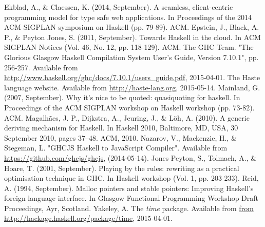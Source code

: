 \documentclass[preprint]{sigplanconf}
\begin{document}
\begin{thebibliography}{}
  Ekblad, A., \& Claessen, K. (2014, September).
  A seamless, client-centric programming model for type safe web applications.
  In Proceedings of the 2014 ACM SIGPLAN symposium on Haskell (pp. 79-89). ACM.
  Epstein, J., Black, A. P., \& Peyton Jones, S. (2011, September).
  Towards Haskell in the cloud.
  In ACM SIGPLAN Notices (Vol. 46, No. 12, pp. 118-129). ACM.
  The GHC Team.
  "The Glorious Glasgow Haskell Compilation System User’s Guide, Version 7.10.1",
  pp. 256-257.
  Available from \url{http://www.haskell.org/ghc/docs/7.10.1/users_guide.pdf},
  2015-04-01.
  The Haste language website.
  Available from \url{http://haste-lang.org}, 2015-05-14.
  Mainland, G. (2007, September).
  Why it's nice to be quoted: quasiquoting for haskell.
  In Proceedings of the ACM SIGPLAN workshop on Haskell workshop (pp. 73-82).
  ACM.
  Magalhães, J. P., Dijkstra, A., Jeuring, J., \& Löh, A. (2010).
  A generic deriving mechanism for Haskell.
  In Haskell 2010, Baltimore, MD, USA, 30 September 2010, pages 37–48. ACM, 2010.
  Nazarov, V., Mackenzie, H., \& Stegeman, L.
  "GHCJS Haskell to JavaScript Compiler".
  Available from \url{https://github.com/ghcjs/ghcjs}, (2014-05-14).
  Jones Peyton, S., Tolmach, A., \& Hoare, T. (2001, September).
  Playing by the rules: rewriting as a practical optimisation technique in GHC.
  In Haskell workshop (Vol. 1, pp. 203-233).
  Reid, A. (1994, September).
  Malloc pointers and stable pointers: Improving Haskell's foreign language
  interface.
  In Glasgow Functional Programming Workshop Draft Proceedings, Ayr, Scotland.
  Yakeley, A.
  The \emph{time} package.
  Available from \url{from http://hackage.haskell.org/package/time}, 2015-04-01.

\end{thebibliography}
\end{document}
